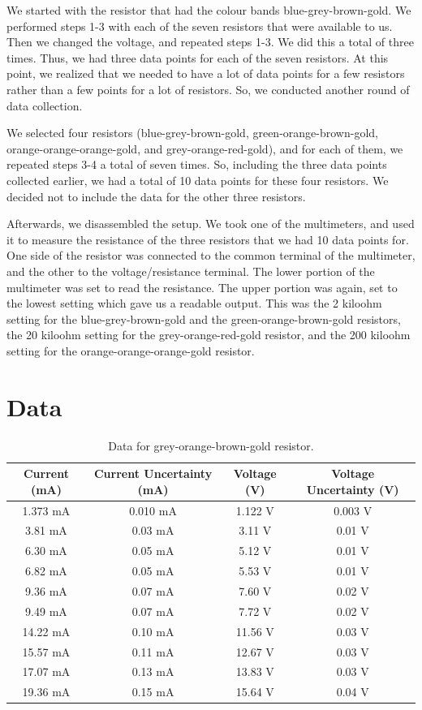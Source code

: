 \documentclass[11pt]{article}
\begin{document}
We started with the resistor that had the colour bands blue-grey-brown-gold. We performed steps 1-3 with each of the seven resistors that were available to us. Then we changed the voltage, and repeated steps 1-3. We did this a total of three times. Thus, we had three data points for each of the seven resistors. At this point, we realized that we needed to have a lot of data points for a few resistors rather than a few points for a lot of resistors. So, we conducted another round of data collection. 

We selected four resistors (blue-grey-brown-gold, green-orange-brown-gold, orange-orange-orange-gold, and grey-orange-red-gold), and for each of them, we repeated steps 3-4 a total of seven times. So, including the three data points collected earlier, we had a total of 10 data points for these four resistors. We decided not to include the data for the other three resistors. 

Afterwards, we disassembled the setup. We took one of the multimeters, and used it to measure the resistance of the three resistors that we had 10 data points for. One side of the resistor was connected to the common terminal of the multimeter, and the other to the voltage/resistance terminal. The lower portion of the multimeter was set to read the resistance. The upper portion was again, set to the lowest setting which gave us a readable output. This was the 2 kiloohm setting for the blue-grey-brown-gold and the green-orange-brown-gold resistors, the 20 kiloohm setting for the grey-orange-red-gold resistor, and the 200 kiloohm setting for the orange-orange-orange-gold resistor.

\section{Data}


\begin{table}[htb]
    \caption{\label{tab:tab1}Data for grey-orange-brown-gold resistor.}
    \vspace{1em}\hline\hline\vspace{0.3em}\centering
    \begin{tabular}{cccc}
        Current (mA)&Current Uncertainty (mA)&Voltage (V)&Voltage Uncertainty (V)\\
        \hline
1.373 mA&0.010 mA&1.122 V&0.003 V\\
3.81 mA&0.03 mA&3.11 V&0.01 V\\
6.30 mA&0.05 mA&5.12 V&0.01 V\\
6.82 mA&0.05 mA&5.53 V&0.01 V\\
9.36 mA&0.07 mA&7.60 V&0.02 V\\
9.49 mA&0.07 mA&7.72 V&0.02 V\\
14.22 mA&0.10 mA&11.56 V&0.03 V\\
15.57 mA&0.11 mA&12.67 V&0.03 V\\
17.07 mA&0.13 mA&13.83 V&0.03 V\\
19.36 mA&0.15 mA&15.64 V&0.04 V\\

    \end{tabular}
    \hline\hline
\end{table}
\end{document}
